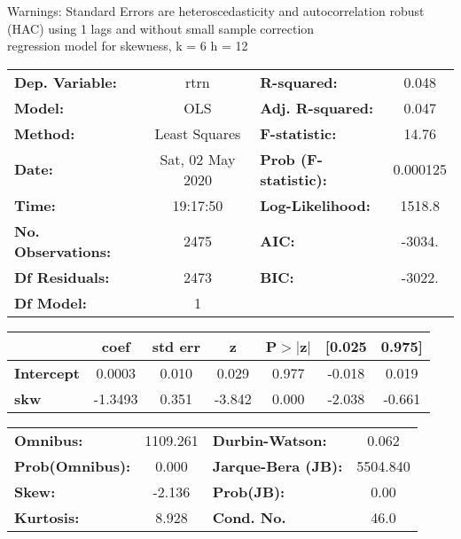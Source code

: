 Warnings: \newline
 [1] Standard Errors are heteroscedasticity and autocorrelation robust (HAC) using 1 lags and without small sample correction\\ 

regression model for skewness, k = 6 h = 12\begin{center}
\begin{tabular}{lclc}
\toprule
\textbf{Dep. Variable:}    &       rtrn       & \textbf{  R-squared:         } &     0.048   \\
\textbf{Model:}            &       OLS        & \textbf{  Adj. R-squared:    } &     0.047   \\
\textbf{Method:}           &  Least Squares   & \textbf{  F-statistic:       } &     14.76   \\
\textbf{Date:}             & Sat, 02 May 2020 & \textbf{  Prob (F-statistic):} &  0.000125   \\
\textbf{Time:}             &     19:17:50     & \textbf{  Log-Likelihood:    } &    1518.8   \\
\textbf{No. Observations:} &        2475      & \textbf{  AIC:               } &    -3034.   \\
\textbf{Df Residuals:}     &        2473      & \textbf{  BIC:               } &    -3022.   \\
\textbf{Df Model:}         &           1      & \textbf{                     } &             \\
\bottomrule
\end{tabular}
\begin{tabular}{lcccccc}
                   & \textbf{coef} & \textbf{std err} & \textbf{z} & \textbf{P$> |$z$|$} & \textbf{[0.025} & \textbf{0.975]}  \\
\midrule
\textbf{Intercept} &       0.0003  &        0.010     &     0.029  &         0.977        &       -0.018    &        0.019     \\
\textbf{skw}       &      -1.3493  &        0.351     &    -3.842  &         0.000        &       -2.038    &       -0.661     \\
\bottomrule
\end{tabular}
\begin{tabular}{lclc}
\textbf{Omnibus:}       & 1109.261 & \textbf{  Durbin-Watson:     } &    0.062  \\
\textbf{Prob(Omnibus):} &   0.000  & \textbf{  Jarque-Bera (JB):  } & 5504.840  \\
\textbf{Skew:}          &  -2.136  & \textbf{  Prob(JB):          } &     0.00  \\
\textbf{Kurtosis:}      &   8.928  & \textbf{  Cond. No.          } &     46.0  \\
\bottomrule
\end{tabular}
\end{center}

